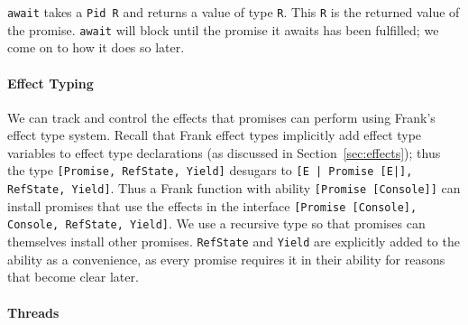 \documentclass[msc,deptreport,cs]{infthesis} %
\newcommand{\code}[1]{\lstinline{#1}}
\newcommand{\todo}[1]
           {{\par\noindent\small\color{RoyalPurple}
  \framebox{\parbox{\dimexpr\linewidth-2\fboxsep-2\fboxrule}
    {\textbf{TODO:} #1}}}}
\begin{document}
\code{await} takes a \code{Pid R} and returns a value of type \code{R}. This
\code{R} is the returned value of the promise. \code{await} will block until the
promise it awaits has been fulfilled; we come on to how it does so later.

\paragraph*{Effect Typing}





We can track and control the effects that promises can perform using Frank's
effect type system. Recall that Frank effect types implicitly add effect type
variables to effect type declarations (as discussed in
Section~\ref{sec:effects}); thus the type \code{[Promise, RefState, Yield]}
desugars to \code{[E | Promise [E|], RefState, Yield]}. Thus a Frank function
with ability \code{[Promise [Console]]} can install promises that use the
effects in the interface \code{[Promise [Console], Console, RefState, Yield]}.
We use a recursive type so that promises can themselves install other promises.
\code{RefState} and \code{Yield} are explicitly added to the ability as a
convenience, as every promise requires it in their ability for reasons that
become clear later.

\paragraph*{Threads}

\end{document}
